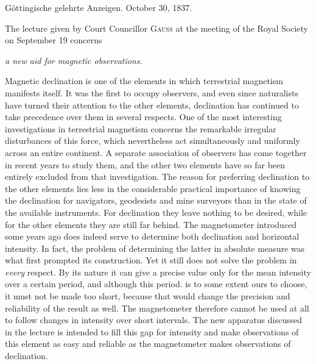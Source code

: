 \clearpage
{}
\begin{center}
Göttingische gelehrte Anzeigen. October 30, 1837.
\end{center}

The lecture given by Court Councillor \textsc{Gauss} at the meeting of the Royal Society on September 19 concerns
\begin{center}
\textit{a new aid for magnetic observations.}
\end{center}

Magnetic declination is one of the elements in which terrestrial magnetism manifests itself. It was the first to occupy observers, and even since naturalists have turned their attention to the other elements, declination has continued to take precedence over them in several respects. One of the most interesting investigations in terrestrial magnetism concerns the remarkable irregular disturbances of this force, which nevertheless act simultaneously and uniformly across an entire continent. A separate association of observers has come together in recent years to study them, and the other two elements have so far been entirely excluded from that investigation. The reason for preferring declination to the other elements lies less in the considerable practical importance of knowing the declination for navigators, geodesists and mine surveyors than in the state of the available instruments. For declination they leave nothing to be desired, while for the other elements they are still far behind. The magnetometer introduced some years ago does indeed serve to determine both declination and horizontal intensity. In fact, the problem of determining the latter in absolute measure was what first prompted its construction. Yet it still does not solve the problem in \textit{every} respect. By its nature it can give a precise value only for the mean intensity over a certain period, and although this period. is to some extent ours to choose, it must not be made too short, because that would change the precision and reliability of the result as well. The magnetometer therefore cannot be used at all to follow changes in intensity over short intervals. The new apparatus discussed in the lecture is intended to fill this gap for intensity and make observations of this element as easy and reliable as the magnetometer makes observations of declination.

